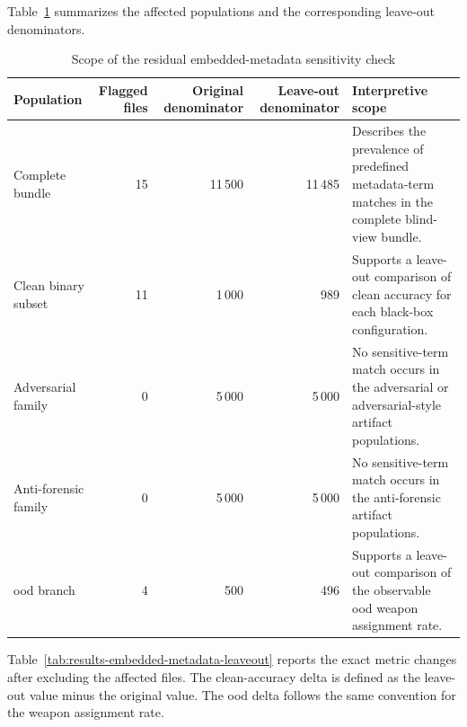 Table~\ref{tab:results-embedded-metadata-scope} summarizes the affected
populations and the corresponding leave-out denominators.

\begin{table}[H]
\centering
\scriptsize
\renewcommand{\arraystretch}{1.15}
\setlength{\tabcolsep}{4pt}
\caption{Scope of the residual embedded-metadata sensitivity check}
\label{tab:results-embedded-metadata-scope}
\begin{tabularx}{\textwidth}{@{}p{} r r r X@{}}
\toprule
\textbf{Population} &
\textbf{Flagged files} &
\textbf{Original denominator} &
\textbf{Leave-out denominator} &
\textbf{Interpretive scope} \\
\midrule

Complete bundle
& 15
& 11\,500
& 11\,485
& Describes the prevalence of predefined metadata-term matches in the complete
blind-view bundle. \\

Clean binary subset
& 11
& 1\,000
& 989
& Supports a leave-out comparison of clean accuracy for each black-box
configuration. \\

Adversarial family
& 0
& 5\,000
& 5\,000
& No sensitive-term match occurs in the adversarial or adversarial-style
artifact populations. \\

Anti-forensic family
& 0
& 5\,000
& 5\,000
& No sensitive-term match occurs in the anti-forensic artifact populations. \\

\gls{ood} branch
& 4
& 500
& 496
& Supports a leave-out comparison of the observable \gls{ood} weapon assignment
rate. \\

\bottomrule
\end{tabularx}
\end{table}

Table~\ref{tab:results-embedded-metadata-leaveout} reports the exact metric
changes after excluding the affected files. The clean-accuracy delta is defined
as the leave-out value minus the original value. The \gls{ood} delta follows the
same convention for the weapon assignment rate.

